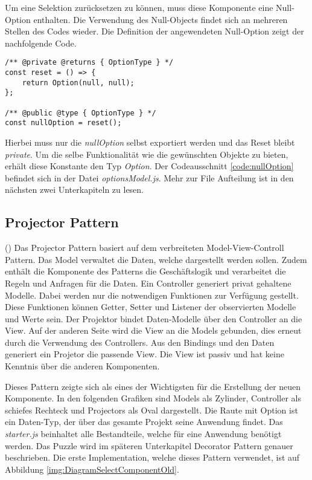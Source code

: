 Um eine Selektion zurücksetzen zu können, muss diese Komponente eine Null-Option enthalten.
Die Verwendung des Null-Objects findet sich an mehreren Stellen des Codes wieder.
Die Definition der angewendeten Null-Option zeigt der nachfolgende Code.

\begin{lstlisting}[style = htmlcssjs, caption = Null-Option, label = code:nullOption]
/** @private @returns { OptionType } */
const reset = () => {
    return Option(null, null);
};

/** @public @type { OptionType } */
const nullOption = reset();
\end{lstlisting}

Hierbei muss nur die \emph{nullOption} selbst exportiert werden und das Reset bleibt \emph{private}.
Um die selbe Funktionalität wie die gewünschten Objekte zu bieten, erhält diese Konstante den Typ \emph{Option}.
Der Codeausschnitt \ref{code:nullOption} befindet sich in der Datei \emph{optionsModel.js}.
Mehr zur File Aufteilung ist in den nächsten zwei Unterkapiteln zu lesen.

\subsection{Projector Pattern}
\label{sec:projectorPattern}

(\cite{projectorPattern}) Das Projector Pattern basiert auf dem verbreiteten Model-View-Controll Pattern.
Das Model verwaltet die Daten, welche dargestellt werden sollen.
Zudem enthält die Komponente des Patterns die Geschäftslogik und verarbeitet die Regeln und Anfragen für die Daten.
Ein Controller generiert privat gehaltene Modelle.
Dabei werden nur die notwendigen Funktionen zur Verfügung gestellt.
Diese Funktionen können Getter, Setter und Listener der observierten Modelle und Werte sein.
Der Projektor bindet Daten-Modelle über den Controller an die View.
Auf der anderen Seite wird die View an die Models gebunden, dies erneut durch die Verwendung des Controllers.
Aus den Bindings und den Daten generiert ein Projetor die passende View.
Die View ist passiv und hat keine Kenntnis über die anderen Komponenten.

Dieses Pattern zeigte sich als eines der Wichtigsten für die Erstellung der neuen Komponente.
In den folgenden Grafiken sind Models als Zylinder, Controller als schiefes Rechteck und Projectors als Oval dargestellt.
Die Raute mit Option ist ein Daten-Typ, der über das gesamte Projekt seine Anwendung findet.
Das \emph{starter.js} beinhaltet alle Bestandteile, welche für eine Anwendung benötigt werden.
Das Puzzle wird im späteren Unterkapitel Decorator Pattern genauer beschrieben.
Die erste Implementation, welche dieses Pattern verwendet, ist auf Abbildung \ref{img:DiagramSelectComponentOld}.

